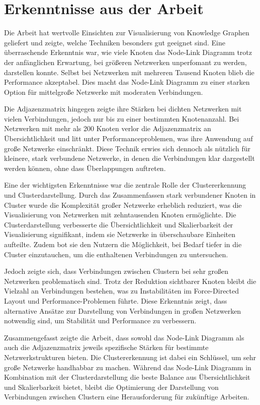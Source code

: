 \section{Erkenntnisse aus der Arbeit}

Die Arbeit hat wertvolle Einsichten zur Visualisierung von Knowledge Graphen geliefert und zeigte, welche Techniken besonders gut geeignet sind. Eine überraschende Erkenntnis war, wie viele Knoten das Node-Link Diagramm trotz der anfänglichen Erwartung, bei größeren Netzwerken unperfomant zu werden, darstellen konnte. Selbst bei Netzwerken mit mehreren Tausend Knoten blieb die Performance akzeptabel. Dies macht das Node-Link Diagramm zu einer starken Option für mittelgroße Netzwerke mit moderaten Verbindungen.

Die Adjazenzmatrix hingegen zeigte ihre Stärken bei dichten Netzwerken mit vielen Verbindungen, jedoch nur bis zu einer bestimmten Knotenanzahl. Bei Netzwerken mit mehr als 200 Knoten verlor die Adjazenzmatrix an Übersichtlichkeit und litt unter Performanceproblemen, was ihre Anwendung auf große Netzwerke einschränkt. Diese Technik erwies sich dennoch als nützlich für kleinere, stark verbundene Netzwerke, in denen die Verbindungen klar dargestellt werden können, ohne dass Überlappungen auftreten.

Eine der wichtigsten Erkenntnisse war die zentrale Rolle der Clustererkennung und Clusterdarstellung. Durch das Zusammenfassen stark verbundener Knoten in Cluster wurde die Komplexität großer Netzwerke erheblich reduziert, was die Visualisierung von Netzwerken mit zehntausenden Knoten ermöglichte. Die Clusterdarstellung verbesserte die Übersichtlichkeit und Skalierbarkeit der Visualisierung signifikant, indem sie Netzwerke in überschaubare Einheiten aufteilte. Zudem bot sie den Nutzern die Möglichkeit, bei Bedarf tiefer in die Cluster einzutauchen, um die enthaltenen Verbindungen zu untersuchen.

Jedoch zeigte sich, dass Verbindungen zwischen Clustern bei sehr großen Netzwerken problematisch sind. Trotz der Reduktion sichtbarer Knoten bleibt die Vielzahl an Verbindungen bestehen, was zu Instabilitäten im Force-Directed Layout und Performance-Problemen führte. Diese Erkenntnis zeigt, dass alternative Ansätze zur Darstellung von Verbindungen in großen Netzwerken notwendig sind, um Stabilität und Performance zu verbessern.

Zusammengefasst zeigte die Arbeit, dass sowohl das Node-Link Diagramm als auch die Adjazenzmatrix jeweils spezifische Stärken für bestimmte Netzwerkstrukturen bieten. Die Clustererkennung ist dabei ein Schlüssel, um sehr große Netzwerke handhabbar zu machen. Während das Node-Link Diagramm in Kombination mit der Clusterdarstellung die beste Balance aus Übersichtlichkeit und Skalierbarkeit bietet, bleibt die Optimierung der Darstellung von Verbindungen zwischen Clustern eine Herausforderung für zukünftige Arbeiten.


